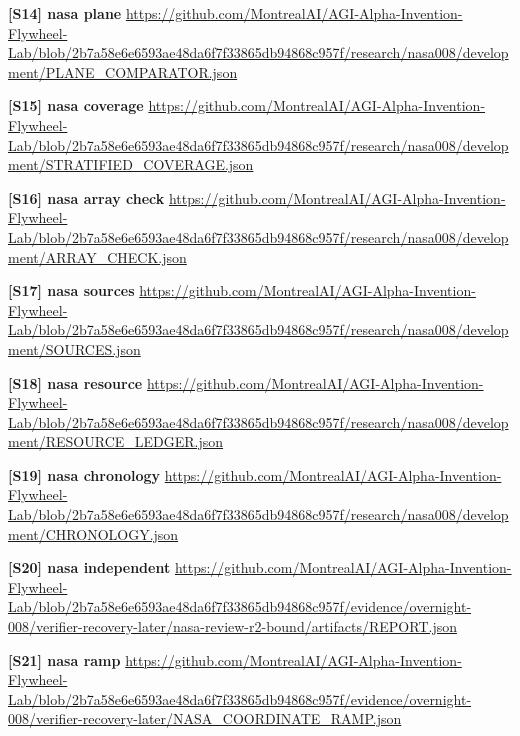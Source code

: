 \documentclass[11pt,letterpaper]{article}
\begin{document}
\begin{samepage}\small\textbf{[S14] nasa plane} \url{https://github.com/MontrealAI/AGI-Alpha-Invention-Flywheel-Lab/blob/2b7a58e6e6593ae48da6f7f33865db94868c957f/research/nasa008/development/PLANE_COMPARATOR.json}\par\normalsize\end{samepage}
\begin{samepage}\small\textbf{[S15] nasa coverage} \url{https://github.com/MontrealAI/AGI-Alpha-Invention-Flywheel-Lab/blob/2b7a58e6e6593ae48da6f7f33865db94868c957f/research/nasa008/development/STRATIFIED_COVERAGE.json}\par\normalsize\end{samepage}
\begin{samepage}\small\textbf{[S16] nasa array check} \url{https://github.com/MontrealAI/AGI-Alpha-Invention-Flywheel-Lab/blob/2b7a58e6e6593ae48da6f7f33865db94868c957f/research/nasa008/development/ARRAY_CHECK.json}\par\normalsize\end{samepage}
\begin{samepage}\small\textbf{[S17] nasa sources} \url{https://github.com/MontrealAI/AGI-Alpha-Invention-Flywheel-Lab/blob/2b7a58e6e6593ae48da6f7f33865db94868c957f/research/nasa008/development/SOURCES.json}\par\normalsize\end{samepage}
\begin{samepage}\small\textbf{[S18] nasa resource} \url{https://github.com/MontrealAI/AGI-Alpha-Invention-Flywheel-Lab/blob/2b7a58e6e6593ae48da6f7f33865db94868c957f/research/nasa008/development/RESOURCE_LEDGER.json}\par\normalsize\end{samepage}
\begin{samepage}\small\textbf{[S19] nasa chronology} \url{https://github.com/MontrealAI/AGI-Alpha-Invention-Flywheel-Lab/blob/2b7a58e6e6593ae48da6f7f33865db94868c957f/research/nasa008/development/CHRONOLOGY.json}\par\normalsize\end{samepage}
\begin{samepage}\small\textbf{[S20] nasa independent} \url{https://github.com/MontrealAI/AGI-Alpha-Invention-Flywheel-Lab/blob/2b7a58e6e6593ae48da6f7f33865db94868c957f/evidence/overnight-008/verifier-recovery-later/nasa-review-r2-bound/artifacts/REPORT.json}\par\normalsize\end{samepage}
\begin{samepage}\small\textbf{[S21] nasa ramp} \url{https://github.com/MontrealAI/AGI-Alpha-Invention-Flywheel-Lab/blob/2b7a58e6e6593ae48da6f7f33865db94868c957f/evidence/overnight-008/verifier-recovery-later/NASA_COORDINATE_RAMP.json}\par\normalsize\end{samepage}
\end{document}
